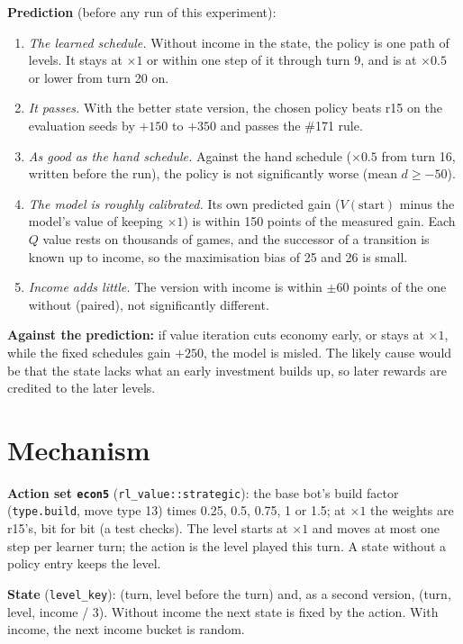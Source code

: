 \documentclass{../polyexp}
\begin{document}
\textbf{Prediction} (before any run of this experiment):
\begin{enumerate}
  \item \emph{The learned schedule.} Without income in the state, the policy is one path of levels. It stays at
        $\times1$ or within one step of it through turn 9, and is at $\times0.5$ or lower from turn 20 on.
  \item \emph{It passes.} With the better state version, the chosen policy beats r15 on the evaluation seeds by
        $+150$ to $+350$ and passes the \#171 rule.
  \item \emph{As good as the hand schedule.} Against the hand schedule ($\times0.5$ from turn 16, written before the
        run), the policy is not significantly worse (mean $d \ge -50$).
  \item \emph{The model is roughly calibrated.} Its own predicted gain ($V(\text{start})$ minus the model's value of
        keeping $\times1$) is within 150 points of the measured gain. Each $Q$ value rests on thousands of games, and
        the successor of a transition is known up to income, so the maximisation bias of 25 and 26 is small.
  \item \emph{Income adds little.} The version with income is within $\pm 60$ points of the one without (paired),
        not significantly different.
\end{enumerate}
\textbf{Against the prediction:} if value iteration cuts economy early, or stays at $\times1$, while the fixed
schedules gain $+250$, the model is misled. The likely cause would be that the state lacks what an early investment
builds up, so later rewards are credited to the later levels.

\section{Mechanism}
\textbf{Action set \texttt{econ5}} (\texttt{rl\_value::strategic}): the base bot's build factor (\texttt{type.build},
move type 13) times 0.25, 0.5, 0.75, 1 or 1.5; at $\times1$ the weights are r15's, bit for bit (a test checks). The
level starts at $\times1$ and moves at most one step per learner turn; the action is the level played this turn. A
state without a policy entry keeps the level.

\textbf{State} (\texttt{level\_key}): (turn, level before the turn) and, as a second version, (turn, level, income
/ 3). Without income the next state is fixed by the action. With income, the next income bucket is random.
\end{document}
